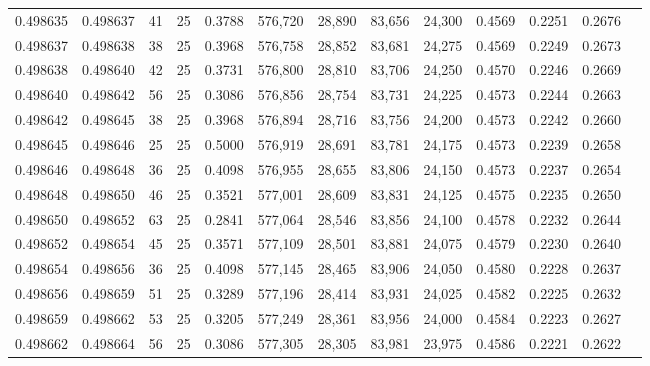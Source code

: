 \begin{tabular}{rrrrrrrrrrrrr}
0.498635 & 0.498637 &    41 &  25 &                                     0.3788 & 576,720 &  28,890 &  83,656 &  24,300 & 0.4569 & 0.2251 & 0.2676 \\
0.498637 & 0.498638 &    38 &  25 &                                     0.3968 & 576,758 &  28,852 &  83,681 &  24,275 & 0.4569 & 0.2249 & 0.2673 \\
0.498638 & 0.498640 &    42 &  25 &                                     0.3731 & 576,800 &  28,810 &  83,706 &  24,250 & 0.4570 & 0.2246 & 0.2669 \\
0.498640 & 0.498642 &    56 &  25 &                                     0.3086 & 576,856 &  28,754 &  83,731 &  24,225 & 0.4573 & 0.2244 & 0.2663 \\
0.498642 & 0.498645 &    38 &  25 &                                     0.3968 & 576,894 &  28,716 &  83,756 &  24,200 & 0.4573 & 0.2242 & 0.2660 \\
0.498645 & 0.498646 &    25 &  25 &                                     0.5000 & 576,919 &  28,691 &  83,781 &  24,175 & 0.4573 & 0.2239 & 0.2658 \\
0.498646 & 0.498648 &    36 &  25 &                                     0.4098 & 576,955 &  28,655 &  83,806 &  24,150 & 0.4573 & 0.2237 & 0.2654 \\
0.498648 & 0.498650 &    46 &  25 &                                     0.3521 & 577,001 &  28,609 &  83,831 &  24,125 & 0.4575 & 0.2235 & 0.2650 \\
0.498650 & 0.498652 &    63 &  25 &                                     0.2841 & 577,064 &  28,546 &  83,856 &  24,100 & 0.4578 & 0.2232 & 0.2644 \\
0.498652 & 0.498654 &    45 &  25 &                                     0.3571 & 577,109 &  28,501 &  83,881 &  24,075 & 0.4579 & 0.2230 & 0.2640 \\
0.498654 & 0.498656 &    36 &  25 &                                     0.4098 & 577,145 &  28,465 &  83,906 &  24,050 & 0.4580 & 0.2228 & 0.2637 \\
0.498656 & 0.498659 &    51 &  25 &                                     0.3289 & 577,196 &  28,414 &  83,931 &  24,025 & 0.4582 & 0.2225 & 0.2632 \\
0.498659 & 0.498662 &    53 &  25 &                                     0.3205 & 577,249 &  28,361 &  83,956 &  24,000 & 0.4584 & 0.2223 & 0.2627 \\
0.498662 & 0.498664 &    56 &  25 &                                     0.3086 & 577,305 &  28,305 &  83,981 &  23,975 & 0.4586 & 0.2221 & 0.2622 \\

\end{tabular}
